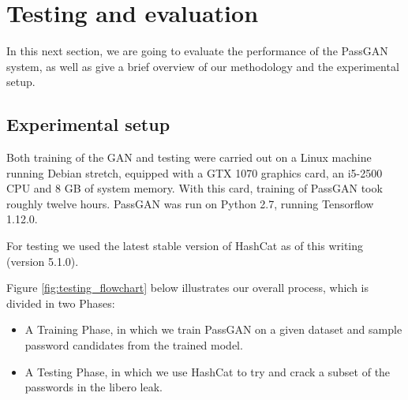 \section{Testing and evaluation}


In this next section, we are going to evaluate the performance of the PassGAN system, as well as give a brief overview of our methodology and the experimental setup.

\subsection{Experimental setup}
Both training of the GAN and testing were carried out on a Linux machine running Debian stretch, equipped with a GTX 1070 graphics card, an i5-2500 CPU and 8 GB of system memory. 
With this card, training of PassGAN took roughly twelve hours.
PassGAN was run on Python 2.7, running Tensorflow 1.12.0.%

For testing we used the latest stable version of HashCat as of this writing (version 5.1.0). %

Figure \ref{fig:testing_flowchart} below illustrates our overall process, which is divided in two Phases: 
\begin{itemize}
    \item A Training Phase, in which we train PassGAN on a given dataset and sample password candidates from the trained model.
    \item A Testing Phase, in which we use HashCat to try and crack a subset of the passwords in the libero leak.
\end{itemize}

